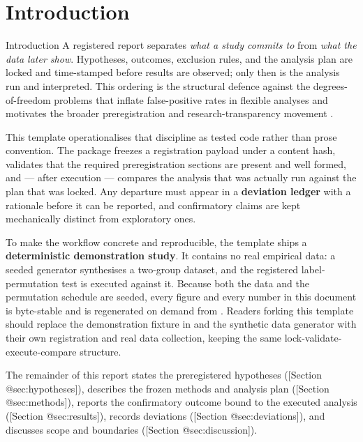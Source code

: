 \documentclass[
  ignorenonframetext,
]{beamer}
\author{\texorpdfstring{}{}}
\date{}
\begin{document}
\section{Introduction}\label{sec:introduction}

\begin{frame}{Introduction}
A registered report separates \emph{what a study commits to} from
\emph{what the data later show}. Hypotheses, outcomes, exclusion rules,
and the analysis plan are locked and time-stamped before results are
observed; only then is the analysis run and interpreted. This ordering
is the structural defence against the degrees-of-freedom problems that
inflate false-positive rates in flexible analyses
 and motivates the broader preregistration and
research-transparency movement .

This template operationalises that discipline as tested code rather than
prose convention. The  package freezes a
registration payload under a content hash, validates that the required
preregistration sections are present and well formed, and --- after
execution --- compares the analysis that was actually run against the
plan that was locked. Any departure must appear in a \textbf{deviation
ledger} with a rationale before it can be reported, and confirmatory
claims are kept mechanically distinct from exploratory ones.

To make the workflow concrete and reproducible, the template ships a
\textbf{deterministic demonstration study}. It contains no real
empirical data: a seeded generator synthesises a two-group dataset, and
the registered label-permutation test is executed against it. Because
both the data and the permutation schedule are seeded, every figure and
every number in this document is byte-stable and is regenerated on
demand from . Readers forking this
template should replace the demonstration fixture in
 and the synthetic data
generator with their own registration and real data collection, keeping
the same lock-validate-execute-compare structure.

The remainder of this report states the preregistered hypotheses
({[}Section @sec:hypotheses{]}), describes the frozen methods and
analysis plan ({[}Section @sec:methods{]}), reports the confirmatory
outcome bound to the executed analysis ({[}Section @sec:results{]}),
records deviations ({[}Section @sec:deviations{]}), and discusses scope
and boundaries ({[}Section @sec:discussion{]}).
\end{frame}
\end{document}
